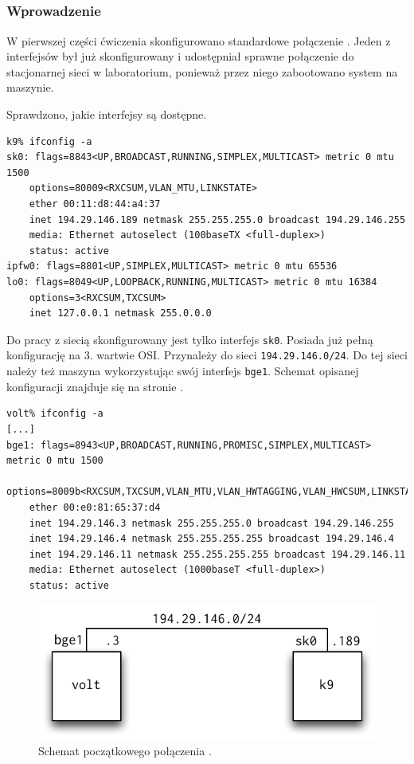 \subsection{\eth}
\label{sec:eth}

\subsubsection{Wprowadzenie}

W pierwszej części ćwiczenia skonfigurowano standardowe połączenie \eth. Jeden z
interfejsów był już skonfigurowany i udostępniał sprawne połączenie do
stacjonarnej sieci w laboratorium, ponieważ przez niego zabootowano system na
maszynie.

Sprawdzono, jakie interfejsy są dostępne.

\begin{lstlisting}
k9% ifconfig -a
sk0: flags=8843<UP,BROADCAST,RUNNING,SIMPLEX,MULTICAST> metric 0 mtu 1500
    options=80009<RXCSUM,VLAN_MTU,LINKSTATE>
    ether 00:11:d8:44:a4:37
    inet 194.29.146.189 netmask 255.255.255.0 broadcast 194.29.146.255
    media: Ethernet autoselect (100baseTX <full-duplex>)
    status: active
ipfw0: flags=8801<UP,SIMPLEX,MULTICAST> metric 0 mtu 65536
lo0: flags=8049<UP,LOOPBACK,RUNNING,MULTICAST> metric 0 mtu 16384
    options=3<RXCSUM,TXCSUM>
    inet 127.0.0.1 netmask 255.0.0.0
\end{lstlisting}

Do pracy z siecią skonfigurowany jest tylko interfejs \texttt{sk0}. Posiada już
pełną konfigurację na 3. wartwie OSI. Przynależy do sieci
\texttt{194.29.146.0/24}. Do tej sieci należy też maszyna \volt{} wykorzystując
swój interfejs \texttt{bge1}. Schemat opisanej konfiguracji znajduje się na
stronie \pageref{fig:eth:schemat-bez-konfiguracji}.

\begin{lstlisting}
volt% ifconfig -a
[...]
bge1: flags=8943<UP,BROADCAST,RUNNING,PROMISC,SIMPLEX,MULTICAST> metric 0 mtu 1500
    options=8009b<RXCSUM,TXCSUM,VLAN_MTU,VLAN_HWTAGGING,VLAN_HWCSUM,LINKSTATE>
    ether 00:e0:81:65:37:d4
    inet 194.29.146.3 netmask 255.255.255.0 broadcast 194.29.146.255
    inet 194.29.146.4 netmask 255.255.255.255 broadcast 194.29.146.4
    inet 194.29.146.11 netmask 255.255.255.255 broadcast 194.29.146.11
    media: Ethernet autoselect (1000baseT <full-duplex>)
    status: active
\end{lstlisting}

\begin{figure}[h!]
  \centering
  \includegraphics{figury/ethernet/schemat-bez-konfiguracji.pdf}
  \caption{Schemat początkowego połączenia \eth.}
  \label{fig:eth:schemat-bez-konfiguracji}
\end{figure}

